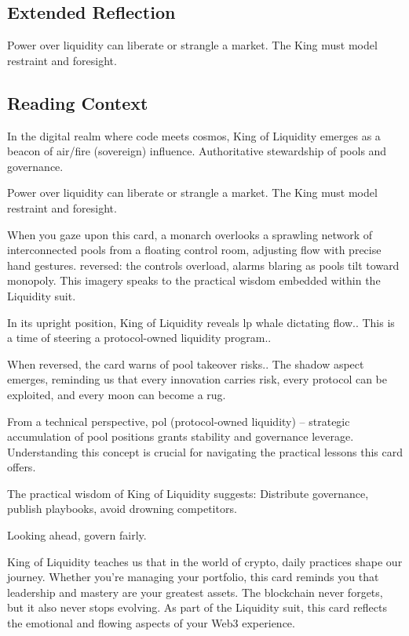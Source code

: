 \documentclass[11pt,oneside]{book}
\begin{document}
\begin{minipage}[t]{0.55\textwidth}
  \subsection*{Extended Reflection}
  Power over liquidity can liberate or strangle a market. The King must model restraint and foresight.

  \subsection*{Reading Context}
  In the digital realm where code meets cosmos, King of Liquidity emerges as a beacon of air/fire (sovereign) influence. Authoritative stewardship of pools and governance.

  Power over liquidity can liberate or strangle a market. The King must model restraint and foresight.

  When you gaze upon this card, a monarch overlooks a sprawling network of interconnected pools from a floating control room, adjusting flow with precise hand gestures. reversed: the controls overload, alarms blaring as pools tilt toward monopoly. This imagery speaks to the practical wisdom embedded within the Liquidity suit.

  In its upright position, King of Liquidity reveals lp whale dictating flow.. This is a time of steering a protocol-owned liquidity program..

  When reversed, the card warns of pool takeover risks.. The shadow aspect emerges, reminding us that every innovation carries risk, every protocol can be exploited, and every moon can become a rug.

  From a technical perspective, pol (protocol-owned liquidity) – strategic accumulation of pool positions grants stability and governance leverage. Understanding this concept is crucial for navigating the practical lessons this card offers.

  The practical wisdom of King of Liquidity suggests: Distribute governance, publish playbooks, avoid drowning competitors.

  Looking ahead, govern fairly.

  King of Liquidity teaches us that in the world of crypto, daily practices shape our journey. Whether you're managing your portfolio, this card reminds you that leadership and mastery are your greatest assets. The blockchain never forgets, but it also never stops evolving. As part of the Liquidity suit, this card reflects the emotional and flowing aspects of your Web3 experience.

\end{minipage}
\end{document}
